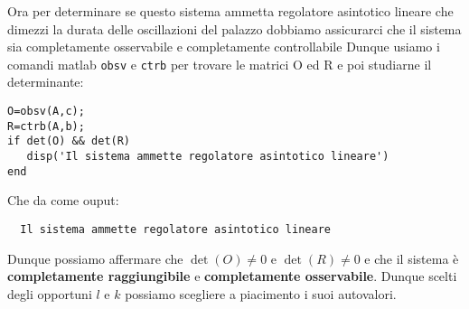 \documentclass[a4paper]{report}
\begin{document}
Ora per determinare se questo sistema ammetta regolatore asintotico lineare
che dimezzi la durata delle oscillazioni del palazzo dobbiamo assicurarci che il sistema
sia completamente osservabile e completamente controllabile
Dunque usiamo i comandi matlab \verb|obsv| e \verb|ctrb| per trovare le matrici O ed R e poi
studiarne il determinante:
\begin{verbatim}
O=obsv(A,c);
R=ctrb(A,b);
if det(O) && det(R)
   disp('Il sistema ammette regolatore asintotico lineare')
end
\end{verbatim}
Che da come ouput:
\begin{verbatim}
  Il sistema ammette regolatore asintotico lineare
\end{verbatim}
Dunque possiamo affermare che $\det (O) \neq 0$ e $\det(R) \neq 0$ e che il sistema è
\textbf{completamente raggiungibile} e \textbf{completamente osservabile}. 
Dunque scelti degli opportuni $l$ e $k$ possiamo scegliere a piacimento i suoi autovalori.
\end{document}
